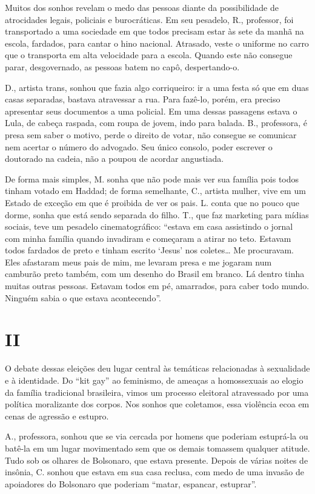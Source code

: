 Muitos dos sonhos revelam o medo das pessoas diante da possibilidade de
atrocidades legais, policiais e burocráticas. Em seu pesadelo, R.,
professor, foi transportado a uma sociedade em que todos precisam estar
às sete da manhã na escola, fardados, para cantar o hino nacional.
Atrasado, veste o uniforme no carro que o transporta em alta velocidade
para a escola. Quando este não consegue parar, desgovernado, as pessoas
batem no capô, despertando-o.

D., artista trans, sonhou que fazia algo corriqueiro: ir a uma festa só
que em duas casas separadas, bastava atravessar a rua. Para fazê-lo,
porém, era preciso apresentar seus documentos a uma policial. Em uma
dessas passagens estava o Lula, de cabeça raspada, com roupa de jovem,
indo para balada. B., professora, é presa sem saber o motivo, perde o
direito de votar, não consegue se comunicar nem acertar o número do
advogado. Seu único consolo, poder escrever o doutorado na cadeia, não a
poupou de acordar angustiada.

De forma mais simples, M. sonha que não pode mais ver sua família pois
todos tinham votado em Haddad; de forma semelhante, C., artista mulher,
vive em um Estado de exceção em que é proibida de ver os pais. L. conta
que no pouco que dorme, sonha que está sendo separada do filho. T., que
faz marketing para mídias sociais, teve um pesadelo cinematográfico:
``estava em casa assistindo o jornal com minha família quando invadiram
e começaram a atirar no teto. Estavam todos fardados de preto e tinham
escrito `Jesus' nos coletes\ldots{} Me procuravam. Eles afastaram meus
pais de mim, me levaram presa e me jogaram num camburão preto também,
com um desenho do Brasil em branco. Lá dentro tinha muitas outras
pessoas. Estavam todos em pé, amarrados, para caber todo mundo. Ninguém
sabia o que estava acontecendo''.

\section*{II}

O debate dessas eleições deu lugar central às temáticas relacionadas à
sexualidade e à identidade. Do ``kit gay'' ao feminismo, de ameaças a
homossexuais ao elogio da família tradicional brasileira, vimos um
processo eleitoral atravessado por uma política moralizante dos corpos.
Nos sonhos que coletamos, essa violência ecoa em cenas de agressão e
estupro.

A., professora, sonhou que se via cercada por homens que poderiam
estuprá-la ou batê-la em um lugar movimentado sem que os demais tomassem
qualquer atitude. Tudo sob os olhares de Bolsonaro, que estava presente.
Depois de várias noites de insônia, C. sonhou que estava em sua casa
reclusa, com medo de uma invasão de apoiadores do Bolsonaro que poderiam
``matar, espancar, estuprar''.

